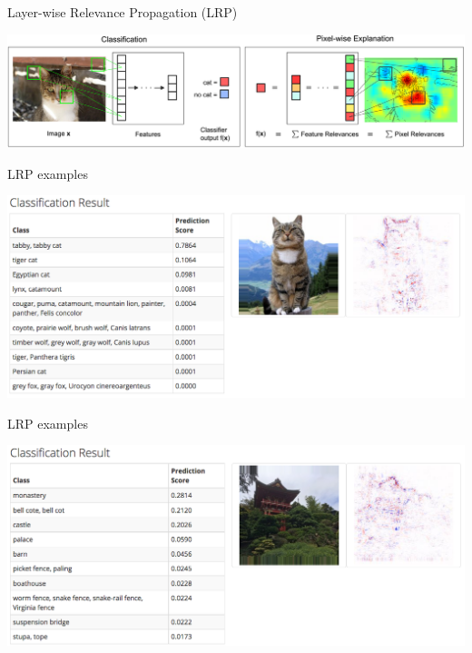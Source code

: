 \documentclass[xetex,compress]{beamer}
\begin{document}
\begin{frame}{Layer-wise Relevance Propagation (LRP)}
  \begin{center}
    \includegraphics[width=1.00\textwidth]{./figures/2-Figure1-1.png}
  \end{center}
\end{frame}

\begin{frame}{LRP examples}
  \begin{center}
    \includegraphics[width=1.00\textwidth]{./figures/lrp_example_1.png}
  \end{center}
\end{frame}

\begin{frame}{LRP examples}
  \begin{center}
    \includegraphics[width=1.00\textwidth]{./figures/lrp_example_2.png}
  \end{center}
\end{frame}
\end{document}

